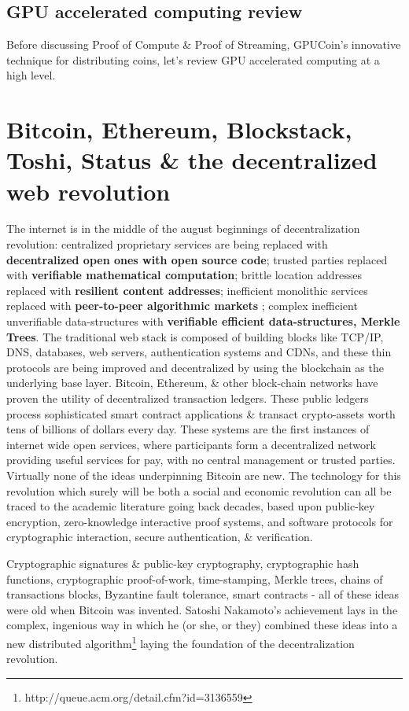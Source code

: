 \documentclass{article}
\begin{document}
\subsection{GPU accelerated computing review}
Before discussing Proof of Compute \& Proof of Streaming, GPUCoin's innovative technique for distributing coins, let’s review GPU accelerated computing at a high level.


\section{Bitcoin, Ethereum, Blockstack, Toshi, Status \& the decentralized web revolution}
 The internet is in the middle of the august beginnings of decentralization revolution: centralized proprietary services are being replaced with \textbf{decentralized open ones with open source code}; trusted parties replaced with \textbf{verifiable mathematical computation}; brittle location addresses replaced with \textbf{resilient content addresses}; inefficient monolithic services replaced with \textbf{peer-to-peer algorithmic markets} ; complex inefficient unverifiable data-structures with \textbf{verifiable efficient data-structures, Merkle Trees}. The traditional web stack is composed of building blocks like TCP/IP, DNS, databases, web servers, authentication systems and CDNs, and these thin protocols are being improved and decentralized by using the blockchain as the underlying base layer. Bitcoin, Ethereum, \& other block-chain networks have proven the utility of decentralized transaction ledgers. These public ledgers process sophisticated smart contract applications \& transact crypto-assets worth tens of billions of dollars every day. These systems are the first instances of internet wide open services, where participants form a decentralized network providing useful services for pay, with no central management or trusted parties.
Virtually none of the ideas underpinning Bitcoin are new. The technology for this revolution which surely will be both a social and economic revolution can all be traced to the academic literature going back decades, based upon public-key encryption, zero-knowledge interactive proof systems, and software protocols for cryptographic interaction, secure authentication, \& verification. 

 Cryptographic signatures \& public-key cryptography, cryptographic hash functions, cryptographic proof-of-work, time-stamping, Merkle trees, chains of transactions blocks, Byzantine fault tolerance, smart contracts - all of these ideas were old when Bitcoin was invented.
 Satoshi Nakamoto's achievement lays in the complex, ingenious way in which he (or she, or they) combined these ideas into a new distributed algorithm\footnote{http://queue.acm.org/detail.cfm?id=3136559} laying the foundation of the decentralization revolution.
 
\end{document}
